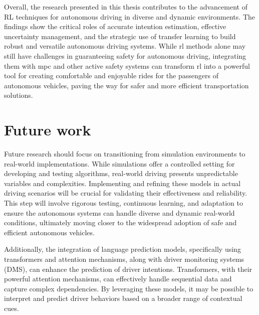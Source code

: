 Overall, the research presented in this thesis contributes to the advancement of RL techniques for autonomous driving in diverse and dynamic environments. The findings show the critical roles of accurate intention estimation, effective uncertainty management, and the strategic use of transfer learning to build robust and versatile autonomous driving systems. While \Gls{rl} methods alone may still have challenges in guaranteeing safety for autonomous driving, integrating them with \gls{mpc} and other active safety systems can transform \gls{rl} into a powerful tool for creating comfortable and enjoyable rides for the passengers of autonomous vehicles, paving the way for safer and more efficient transportation solutions.


\section{Future work}
Future research should focus on transitioning from simulation environments to real-world implementations. While simulations offer a controlled setting for developing and testing algorithms, real-world driving presents unpredictable variables and complexities. Implementing and refining these models in actual driving scenarios will be crucial for validating their effectiveness and reliability. This step will involve rigorous testing, continuous learning, and adaptation to ensure the autonomous systems can handle diverse and dynamic real-world conditions, ultimately moving closer to the widespread adoption of safe and efficient autonomous vehicles.

Additionally, the integration of language prediction models, specifically using transformers and attention mechanisms, along with driver monitoring systems (DMS), can enhance the prediction of driver intentions. Transformers, with their powerful attention mechanisms, can effectively handle sequential data and capture complex dependencies. By leveraging these models, it may be possible to interpret and predict driver behaviors based on a broader range of contextual cues.


